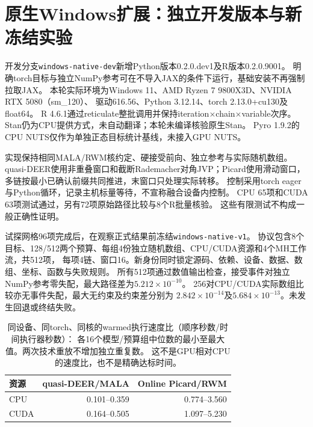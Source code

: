 \section{原生Windows扩展：独立开发版本与新冻结实验}
\label{sec:windows-native}

开发分支\texttt{windows-native-dev}新增Python版本0.2.0.dev1及R版本0.2.0.9001。
明确torch目标与独立NumPy参考可在不导入JAX的条件下运行，基础安装不再强制拉取JAX。
本轮实际环境为Windows 11、AMD Ryzen 7 9800X3D、NVIDIA RTX 5080（sm\_120）、
驱动616.56、Python 3.12.14、torch 2.13.0+cu130及float64。
R 4.6.1通过reticulate整批调用并保持iteration$\times$chain$\times$variable次序。
Stan仍为CPU提供方式，未自动翻译；本轮未编译核验原生Stan。
Pyro 1.9.2的CPU NUTS仅作为单独正态目标统计基线，未接入GPU NUTS。

实现保持相同MALA/RWM核约定、硬接受前向、独立参考与实际随机数组。
quasi-DEER使用非重叠窗口和截断Rademacher对角JVP；Picard使用滑动窗口，
多链按最小已确认前缀共同推进，末窗口只处理实际转移。
控制采用torch eager与Python循环，记录主机标量等待，不宣称融合设备内控制。
CPU 65项和CUDA 63项测试通过，另有72项原始路径比较与8个R批量核验。
这些有限测试不构成一般正确性证明。

试探网格96项完成后，在观察正式结果前冻结\texttt{windows-native-v1}。
协议包含8个目标、128/512两个预算、每组4份独立随机数组、CPU/CUDA资源和4个MH工作流，共512项，
每项4链、窗口16。新身份同时锁定源码、依赖、设备、数据、数组、坐标、函数与失败规则。
所有512项通过数值输出检查，接受事件对独立NumPy参考零失配，最大路径差为$5.212\times10^{-10}$。
256对CPU/CUDA实际数组比较亦无事件失配，最大无约束及约束差分别为
$2.842\times10^{-14}$及$5.684\times10^{-13}$。未发生回退或终结失败。

\begin{table}[htbp]\centering\small
\begin{tabular}{lrr}\toprule
资源 & quasi-DEER/MALA & Online Picard/RWM\\\midrule
CPU & 0.101--0.359 & 0.774--3.560\\
CUDA & 0.164--0.505 & 1.097--5.230\\\bottomrule
\end{tabular}
\caption{同设备、同torch、同核的warmed执行速度比（顺序秒数/时间执行器秒数）：
各16个模型/预算组中位数的最小至最大值。两次技术重放不增加独立重复数。
这不是GPU相对CPU的速度比，也不是精确达标时间。}
\end{table}

